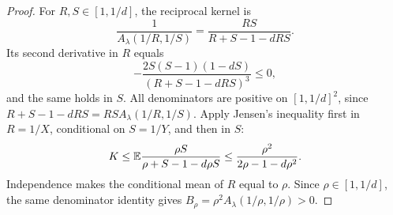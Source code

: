 \begin{proof}
For $R,S\in[1,1/d]$, the reciprocal kernel is
\begin{equation*}
 \frac1{A_\lambda(1/R,1/S)}=\frac{RS}{R+S-1-dRS}.
\end{equation*}
Its second derivative in $R$ equals
\begin{equation*}
 -\frac{2S(S-1)(1-dS)}{(R+S-1-dRS)^3}\le0,
\end{equation*}
and the same holds in $S$. All denominators are positive on $[1,1/d]^2$, since $R+S-1-dRS=RS A_\lambda(1/R,1/S)$. Apply Jensen's inequality first in $R=1/X$, conditional on $S=1/Y$, and then in $S$:
\[
 K\le\mathbb E\frac{\rho S}{\rho+S-1-d\rho S}
 \le\frac{\rho^2}{2\rho-1-d\rho^2}.
\]
Independence makes the conditional mean of $R$ equal to $\rho$. Since $\rho\in[1,1/d]$, the same denominator identity gives $B_\rho=\rho^2A_\lambda(1/\rho,1/\rho)>0$.
\end{proof}

